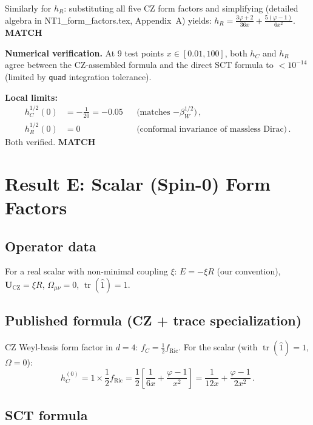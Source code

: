 \documentclass[12pt,a4paper]{article}
\theoremstyle{definition}
\theoremstyle{remark}
\newcommand{\tr}{\operatorname{tr}}
\newcommand{\match}{\textcolor{green!60!black}{\textbf{MATCH}}}
\begin{document}
\medskip\noindent
Similarly for $h_R$: substituting all five CZ form factors and simplifying
(detailed algebra in NT1\_form\_factors.tex, Appendix~A) yields:
$h_R = \frac{3\varphi+2}{36x} + \frac{5(\varphi-1)}{6x^2}$. \match

\medskip\noindent
\textbf{Numerical verification.}
At 9 test points $x \in [0.01, 100]$, both $h_C$ and $h_R$ agree between
the CZ-assembled formula and the direct SCT formula to $< 10^{-14}$
(limited by \texttt{quad} integration tolerance).

\medskip\noindent
\textbf{Local limits:}
\begin{align*}
  h_C^{1/2}(0) &= -\frac{1}{20} = -0.05
  &&\text{(matches $-\beta_W^{1/2}$)}\,,\\
  h_R^{1/2}(0) &= 0
  &&\text{(conformal invariance of massless Dirac)}\,.
\end{align*}
Both verified. \match


\section{Result E: Scalar (Spin-0) Form Factors}
\label{sec:scalar}

\subsection{Operator data}

For a real scalar with non-minimal coupling $\xi$:
$E = -\xi R$ (our convention), $\mathbf{U}_{\text{CZ}} = \xi R$,
$\Omega_{\mu\nu} = 0$, $\tr(\hat{1}) = 1$.

\subsection{Published formula (CZ + trace specialization)}

CZ Weyl-basis form factor in $d=4$: $f_C = \frac{1}{2}f_{\text{Ric}}$.
For the scalar (with $\tr(\hat{1}) = 1$, $\Omega = 0$):
\[
  h_C^{(0)} = 1 \times \frac{1}{2}f_{\text{Ric}}
  = \frac{1}{2}\!\left[\frac{1}{6x} + \frac{\varphi-1}{x^2}\right]
  = \frac{1}{12x} + \frac{\varphi-1}{2x^2}\,.
\]

\subsection{SCT formula}
\end{document}
